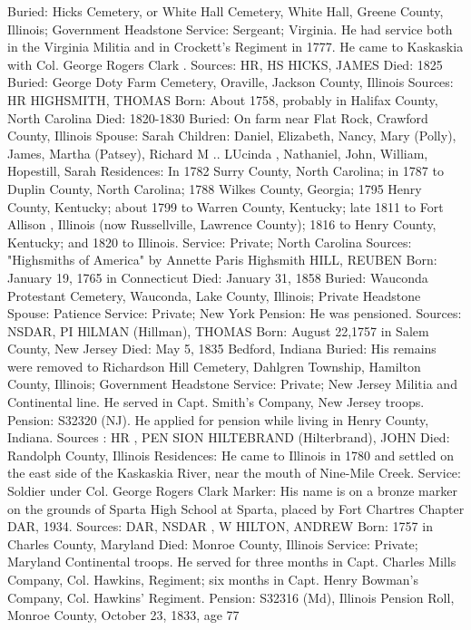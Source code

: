 Buried: Hicks Cemetery, or White Hall Cemetery, White Hall, Greene County, Illinois; Government Headstone 
Service: Sergeant; Virginia. He had service both in the Virginia Militia and in Crockett's Regiment in 1777. He came to Kaskaskia with Col. George Rogers Clark . 
Sources: HR, HS 
HICKS, JAMES 
Died: 1825
Buried: George Doty Farm Cemetery, Oraville, Jackson County, Illinois 
Sources: HR 
HIGHSMITH, THOMAS 
Born: About 1758, probably in Halifax County, North Carolina 
Died: 1820-1830 
Buried: On farm near Flat Rock, Crawford County, Illinois 
Spouse: Sarah 
Children: Daniel, Elizabeth, Nancy, Mary (Polly), James, Martha (Patsey), Richard M .. LUcinda , Nathaniel, John, William, Hopestill, Sarah Residences: In 1782 Surry County, North Carolina; in 1787 to Duplin County, North Carolina; 1788 Wilkes County, Georgia; 1795 Henry County, Kentucky; about 1799 to Warren County, Kentucky; late 1811 to Fort Allison , Illinois (now Russellville, Lawrence County); 1816 to Henry County, Kentucky; and 1820 to Illinois.
Service: Private; North Carolina
Sources: "Highsmiths of America" by Annette Paris Highsmith 
HILL, REUBEN 
Born: January 19, 1765 in Connecticut 
Died: January 31, 1858 
Buried: Wauconda Protestant Cemetery, Wauconda, Lake County, Illinois; Private Headstone 
Spouse: Patience Service: Private; New York 
Pension: He was pensioned. 
Sources: NSDAR, PI 
HlLMAN (Hillman), THOMAS 
Born: August 22,1757 in Salem County, New Jersey 
Died: May 5, 1835 Bedford, Indiana 
Buried: His remains were removed to Richardson Hill Cemetery, Dahlgren Town­ship, Hamilton County, Illinois; Government Headstone 
Service: Private; New Jersey Militia and Continental line. He served in Capt. Smith's Company, New Jersey troops. Pension: S32320 (NJ). He applied for pension while living in Henry County, Indiana. 
Sources : HR , PEN SION 
HILTEBRAND (Hilterbrand), JOHN 
Died: Randolph County, Illinois 
Residences: He came to Illinois in 1780 and settled on the east side of the Kas­kaskia River, near the mouth of Nine-Mile Creek. 
Service: Soldier under Col. George Rogers Clark 
Marker: His name is on a bronze marker on the grounds of Sparta High School at Sparta, placed by Fort Chartres Chapter DAR, 1934. 
Sources: DAR, NSDAR , W 
HILTON, ANDREW 
Born: 1757 in Charles County, Maryland 
Died: Monroe County, Illinois 
Service: Private; Maryland Continental troops. He served for three months in Capt. Charles Mills Company, Col. Hawkins, Regiment; six months in Capt. Henry Bowman's Company, Col. Hawkins' Regiment. 
Pension: S32316 (Md), Illinois Pension Roll, Monroe County, October 23, 1833, age 77 
